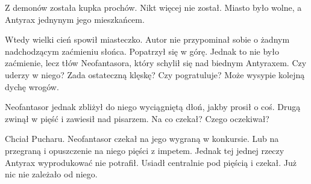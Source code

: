 \divider{}

Z demonów została kupka prochów.
Nikt więcej nie został. Miasto było wolne, a Antyrax jednynym jego mieszkańcem.

Wtedy wielki cień spowił miasteczko.
Autor nie przypominał sobie o żadnym nadchodzącym zaćmieniu słońca.
Popatrzył się w górę.
Jednak to nie było zaćmienie, lecz tłów Neofantasora, który schylił się nad biednym Antyraxem.
Czy uderzy w niego? Zada ostateczną klęskę? Czy pogratuluje? Może wysypie kolejną dychę wrogów.

Neofantasor jednak zbliżył do niego wyciągniętą dłoń, jakby prosił o coś.
Drugą zwinął w pięść i zawiesił nad pisarzem.
Na co czekał? Czego oczekiwał?

Chciał Pucharu.
Neofantasor czekał na jego wygraną w konkursie. Lub na przegraną i opuszczenie na niego pięści z impetem.
Jednak tej jednej rzeczy Antyrax wyprodukować nie potrafił.
Usiadł centralnie pod pięścią i czekał. Już nic nie zależało od niego.


